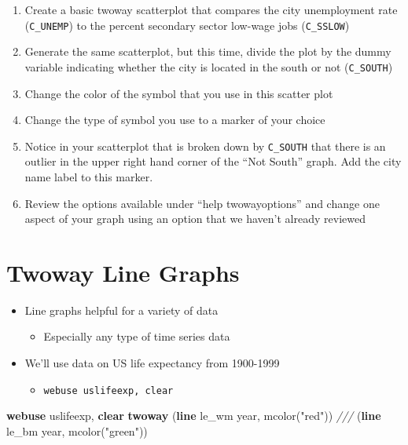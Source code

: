 \documentclass[
]{book}
\newenvironment{Shaded}{\begin{snugshade}}{\end{snugshade}}
\newcommand{\CommentTok}[1]{\textcolor[rgb]{0.56,0.35,0.01}{\textit{#1}}}
\newcommand{\FunctionTok}[1]{\textcolor[rgb]{0.00,0.00,0.00}{#1}}
\newcommand{\KeywordTok}[1]{\textcolor[rgb]{0.13,0.29,0.53}{\textbf{#1}}}
\newcommand{\NormalTok}[1]{#1}
\newcommand{\StringTok}[1]{\textcolor[rgb]{0.31,0.60,0.02}{#1}}
\providecommand{\tightlist}{%
  \setlength{\itemsep}{0pt}\setlength{\parskip}{0pt}}
\begin{document}
\begin{enumerate}
\def\labelenumi{\arabic{enumi}.}
\tightlist
\item
  Create a basic twoway scatterplot that compares the city unemployment rate (\texttt{C\_UNEMP}) to the percent secondary sector low-wage jobs (\texttt{C\_SSLOW})
\item
  Generate the same scatterplot, but this time, divide the plot by the dummy variable indicating whether the city is located in the south or not (\texttt{C\_SOUTH})
\item
  Change the color of the symbol that you use in this scatter plot
\item
  Change the type of symbol you use to a marker of your choice
\item
  Notice in your scatterplot that is broken down by \texttt{C\_SOUTH} that there is an outlier in the upper right hand corner of the ``Not South'' graph. Add the city name label to this marker.
\item
  Review the options available under ``help twowayoptions'' and change one aspect of your graph using an option that we haven't already reviewed
\end{enumerate}

\hypertarget{twoway-line-graphs}{%
\section{Twoway Line Graphs}\label{twoway-line-graphs}}

\begin{itemize}
\tightlist
\item
  Line graphs helpful for a variety of data

  \begin{itemize}
  \tightlist
  \item
    Especially any type of time series data
  \end{itemize}
\item
  We'll use data on US life expectancy from 1900-1999

  \begin{itemize}
  \tightlist
  \item
    \texttt{webuse\ uslifeexp,\ clear}
  \end{itemize}
\end{itemize}

\begin{Shaded}
\begin{Highlighting}[]
  \KeywordTok{webuse}\NormalTok{ uslifeexp, }\KeywordTok{clear}
  \KeywordTok{twoway}\NormalTok{ (}\KeywordTok{line}\NormalTok{ le_wm }\FunctionTok{year}\NormalTok{, mcolor(}\StringTok{"red"}\NormalTok{)) }\CommentTok{///}
\NormalTok{      (}\KeywordTok{line}\NormalTok{ le_bm }\FunctionTok{year}\NormalTok{, mcolor(}\StringTok{"green"}\NormalTok{))}
\end{Highlighting}
\end{Shaded}
\end{document}
